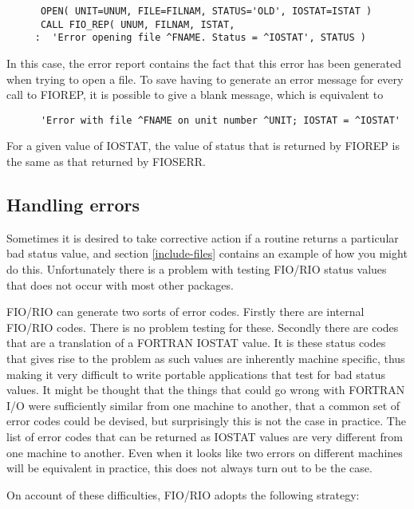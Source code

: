\documentclass[twoside,11pt]{article}
\renewcommand{\_}{\texttt{\symbol{95}}}
\begin{document}
\begin{verbatim}
      OPEN( UNIT=UNUM, FILE=FILNAM, STATUS='OLD', IOSTAT=ISTAT )
      CALL FIO_REP( UNUM, FILNAM, ISTAT,
     :  'Error opening file ^FNAME. Status = ^IOSTAT', STATUS )
\end{verbatim}

In this case, the error report contains the fact that this error has been
generated when trying to open a file. To save having to generate an error
message for every call to FIO\_REP, it is possible to give a blank message,
which is equivalent to

\begin{verbatim}
      'Error with file ^FNAME on unit number ^UNIT; IOSTAT = ^IOSTAT'
\end{verbatim} %

For a given value of IOSTAT, the value of status that is returned by FIO\_REP
is the same as that returned by FIO\_SERR.

\subsection{Handling errors}

Sometimes it is desired to take corrective action if a routine returns a
particular bad status value, and section \ref{include-files} contains an
example of how you might do this. Unfortunately there is a problem with testing
FIO/RIO status values that does not occur with most other packages.

FIO/RIO can generate two sorts of error codes. Firstly there are internal
FIO/RIO codes. There is no problem testing for these. Secondly there are codes
that are a translation of a FORTRAN IOSTAT value. It is these status codes that
gives rise to the problem as such values are inherently machine specific, thus
making it very difficult to write portable applications that test for bad
status values. It might be thought that the things that could go wrong with
FORTRAN I/O were sufficiently similar from one machine to another, that a
common set of error codes could be devised, but surprisingly this is not the
case in practice. The list of error codes that can be returned as IOSTAT values
are very different from one machine to another. Even when it looks like two
errors on different machines will be equivalent in practice, this does not
always turn out to be the case.

On account of these difficulties, FIO/RIO adopts the following strategy:
\end{document}
